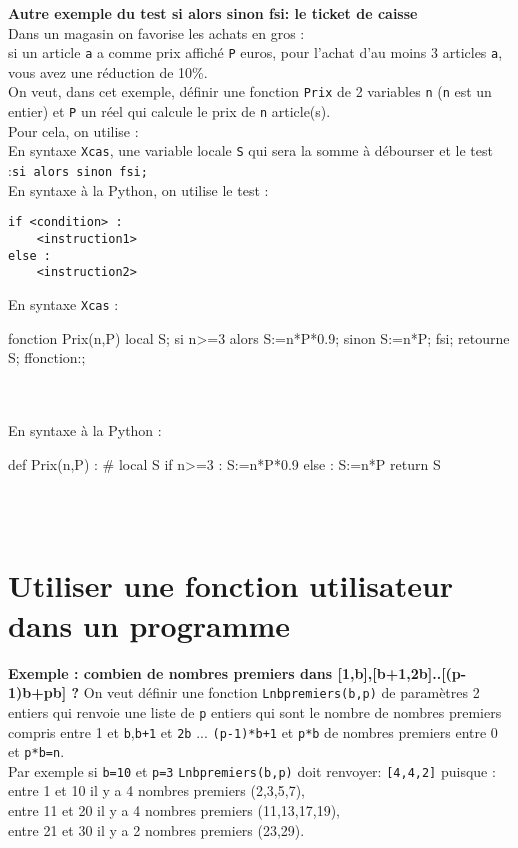 \documentclass[12pt,a4paper]{book}
\begin{document}
\begin{giacjshere}
{\bf Autre exemple du test si alors sinon fsi: le ticket de caisse}\\
Dans un magasin on favorise les achats en gros :\\
si un article {\tt a} a comme prix affich\'e {\tt P} euros, pour l'achat d'au 
moins 3 articles {\tt a}, vous avez une r\'eduction de 10\%.\\
On veut, dans cet exemple, d\'efinir une fonction {\tt Prix} de 2 variables 
{\tt n} ({\tt n} est un entier) et {\tt P} un r\'eel qui calcule le prix de 
{\tt n} article(s).\\ 
Pour cela, on utilise :\\
En syntaxe {\tt Xcas}, une variable locale {\tt S} qui sera la somme \`a 
d\'ebourser et le test :{\tt si  alors sinon  fsi;}\\ 
En syntaxe \`a la Python, on utilise le test :\\
\begin{verbatim}
if <condition> :
    <instruction1> 
else : 
    <instruction2>
\end{verbatim}
En syntaxe {\tt Xcas}  :
\begin{giaconload}
fonction Prix(n,P) 
 local S;
 si n>=3 alors S:=n*P*0.9; 
 sinon S:=n*P; fsi;
 retourne S;
ffonction:;
\end{giaconload}
\\
\\
En syntaxe \`a la Python :
 \begin{giacprog}
def Prix(n,P) :
    # local S
    if n>=3 :
        S:=n*P*0.9
    else :
        S:=n*P
    return S
\end{giacprog}
\\
\\


\section{Utiliser une fonction utilisateur dans un programme}
{\bf Exemple : combien de nombres premiers dans [1,b],[b+1,2b]..[(p-1)b+pb] ?}
On veut d\'efinir une fonction {\tt Lnbpremiers(b,p)} de param\`etres 2 entiers
qui renvoie une liste de {\tt p} entiers qui sont le nombre de nombres premiers 
compris entre 1 et {\tt b},{\tt b+1} et {\tt 2b} ... {\tt (p-1)*b+1} et 
{\tt p*b} de nombres premiers entre 0 et {\tt p*b=n}.\\
Par exemple si {\tt b=10} et {\tt p=3} {\tt Lnbpremiers(b,p)} doit renvoyer:
{\tt [4,4,2]} puisque :\\
entre 1 et 10 il y a 4 nombres premiers (2,3,5,7),\\ 
entre 11 et 20 il y a 4 nombres premiers (11,13,17,19),\\
entre 21 et 30 il y a 2 nombres premiers (23,29).\\


\end{giacjshere}
\end{document}
